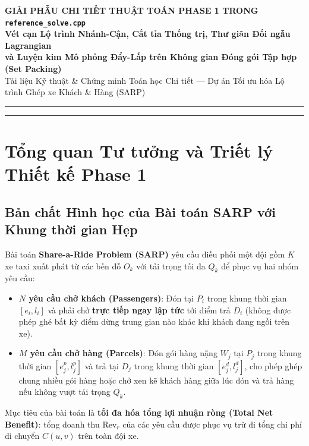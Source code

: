 \documentclass[11pt,a4paper]{article}
\theoremstyle{definition}
\begin{document}
\begin{center}
    {\LARGE\bfseries\textcolor{primaryblue}{GIẢI PHẪU CHI TIẾT THUẬT TOÁN PHASE 1 TRONG \texttt{reference\_solve.cpp}}}\\[0.3cm]
    {\Large\bfseries Vét cạn Lộ trình Nhánh-Cận, Cắt tỉa Thống trị, Thư giãn Đối ngẫu Lagrangian\\và Luyện kim Mô phỏng Đẩy-Lấp trên Không gian Đóng gói Tập hợp (Set Packing)}\\[0.4cm]
    {\normalsize Tài liệu Kỹ thuật \& Chứng minh Toán học Chi tiết --- Dự án Tối ưu hóa Lộ trình Ghép xe Khách \& Hàng (SARP)}\\[0.2cm]
    \rule{\linewidth}{1.2pt}
\end{center}

\tableofcontents
\vspace{0.4cm}
\rule{\linewidth}{0.5pt}
\newpage

\section{Tổng quan Tư tưởng và Triết lý Thiết kế Phase 1}

\subsection{Bản chất Hình học của Bài toán SARP với Khung thời gian Hẹp}
Bài toán \textbf{Share-a-Ride Problem (SARP)} yêu cầu điều phối một đội gồm $K$ xe taxi xuất phát từ các bến đỗ $O_k$ với tải trọng tối đa $Q_k$ để phục vụ hai nhóm yêu cầu:
\begin{itemize}[leftmargin=1.5em]
    \item \textbf{$N$ yêu cầu chở khách (Passengers)}: Đón tại $P_i$ trong khung thời gian $[e_i, l_i]$ và phải chở \textbf{trực tiếp ngay lập tức} tới điểm trả $D_i$ (không được phép ghé bất kỳ điểm dừng trung gian nào khác khi khách đang ngồi trên xe).
    \item \textbf{$M$ yêu cầu chở hàng (Parcels)}: Đón gói hàng nặng $W_j$ tại $P_j$ trong khung thời gian $[e^p_j, l^p_j]$ và trả tại $D_j$ trong khung thời gian $[e^d_j, l^d_j]$, cho phép ghép chung nhiều gói hàng hoặc chở xen kẽ khách hàng giữa lúc đón và trả hàng nếu không vượt tải trọng $Q_k$.
\end{itemize}
Mục tiêu của bài toán là \textbf{tối đa hóa tổng lợi nhuận ròng (Total Net Benefit)}: tổng doanh thu $\text{Rev}_r$ của các yêu cầu được phục vụ trừ đi tổng chi phí di chuyển $C(u, v)$ trên toàn đội xe.
\end{document}
